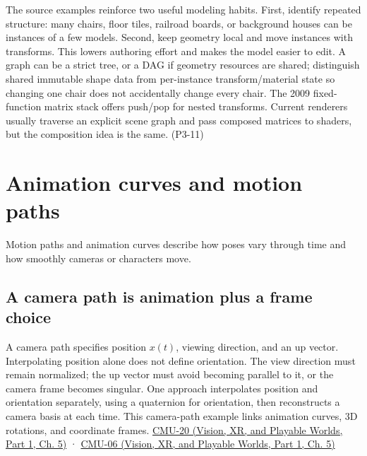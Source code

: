 The source examples reinforce two useful modeling habits. First, identify repeated structure: many chairs, floor tiles, railroad boards, or background houses can be instances of a few models. Second, keep geometry local and move instances with transforms. This lowers authoring effort and makes the model easier to edit. A graph can be a strict tree, or a DAG if geometry resources are shared; distinguish shared immutable shape data from per-instance transform/material state so changing one chair does not accidentally change every chair. The 2009 fixed-function matrix stack offers push/pop for nested transforms. Current renderers usually traverse an explicit scene graph and pass composed matrices to shaders, but the composition idea is the same. (P3-11)

\section{Animation curves and motion paths}\label{04-visual-computing-ii-ch029-animation-curves-and-motion-paths}

\hypertarget{04-visual-computing-ii-ch029-animation-curves-and-motion-paths}{}

Motion paths and animation curves describe how poses vary through time and how smoothly cameras or characters move.

\subsection{A camera path is animation plus a frame choice}\label{04-visual-computing-ii-ch029-a-camera-path-is-animation-plus-a-frame-choice}

\hypertarget{04-visual-computing-ii-ch029-a-camera-path-is-animation-plus-a-frame-choice}{}

A camera path specifies position \(x(t)\), viewing direction, and an up vector. Interpolating position alone does not define orientation. The view direction must remain normalized; the up vector must avoid becoming parallel to it, or the camera frame becomes singular. One approach interpolates position and orientation separately, using a quaternion for orientation, then reconstructs a camera basis at each time. This camera-path example links animation curves, 3D rotations, and coordinate frames. \href{../07-Vision-XR-and-Playable-Worlds-P01/main.pdf\#nameddest=04-visual-computing-ii-ch036-cmu-20---introduction-to-animation}{CMU-20 (Vision, XR, and Playable Worlds, Part 1, Ch. 5)} · \href{../07-Vision-XR-and-Playable-Worlds-P01/main.pdf\#nameddest=04-visual-computing-ii-ch036-cmu-06---3d-rotations-and-complex-representations}{CMU-06 (Vision, XR, and Playable Worlds, Part 1, Ch. 5)}


